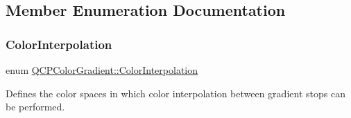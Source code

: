 \subsection{Member Enumeration Documentation}
\mbox{\label{class_q_c_p_color_gradient_ac5dca17cc24336e6ca176610e7f77fc1}} 
\subsubsection{\texorpdfstring{Color\+Interpolation}{ColorInterpolation}\hspace{0.1cm}{\footnotesize\ttfamily [1/2]}}
{\footnotesize\ttfamily enum \hyperlink{class_q_c_p_color_gradient_ac5dca17cc24336e6ca176610e7f77fc1}{Q\+C\+P\+Color\+Gradient\+::\+Color\+Interpolation}}

Defines the color spaces in which color interpolation between gradient stops can be performed.

